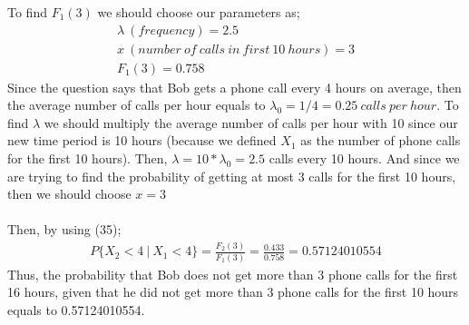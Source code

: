 \documentclass[12pt]{article}
\begin{document}
To find $F_{1}(3)$ we should choose our parameters as;
\begin{equation*} 
\begin{split}
\lambda \ (frequency) = 2.5 \\
x \ (number\ of\ calls\ in\ first\ 10\ hours ) = 3 \\
F_{1}(3) = 0.758
\end{split}
\end{equation*}
Since the question says that Bob gets a phone call every 4 hours on average, then the average number of calls per hour equals to $\lambda_{0} = 1/4 = 0.25\ calls\ per\ hour$. To find $\lambda$ we should multiply the average number of calls per hour with 10 since our new time period is 10 hours (because we defined $X_{1}$ as the number of phone calls for the first 10 hours). Then, $\lambda = 10*\lambda_{0} = 2.5$ calls every 10 hours. And since we are trying to find the probability of getting at most 3 calls for the first 10 hours, then we should choose $x=3$ \\ \\
Then, by using (35);
\begin{equation*} 
\begin{split}
P\{X_{2} < 4 \ |\ X_{1} < 4\} = \frac{ F_{2}(3)}{F_{1}(3)} = \frac{0.433}{0.758} = 0.57124010554
\end{split}
\end{equation*}
Thus, the probability that Bob does not get more than 3 phone calls for the first 16 hours, given that he did not get more than 3 phone calls for the first 10 hours equals to 0.57124010554.
\end{document}

